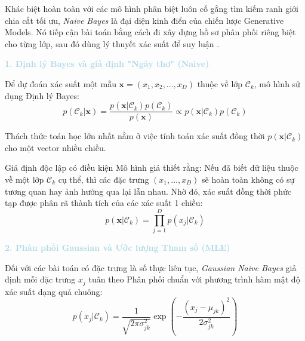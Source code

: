 Khác biệt hoàn toàn với các mô hình phân biệt luôn cố gắng tìm kiếm ranh giới chia cắt tối ưu, \textit{Naive Bayes} là đại diện kinh điển của chiến lược Generative Models. Nó tiếp cận bài toán bằng cách đi xây dựng hồ sơ phân phối riêng biệt cho từng lớp, sau đó dùng lý thuyết xác suất để suy luận \cite{bishop2006pattern}.

\vspace{0.5em}
\noindent\textcolor{lightblue}{\textbf{1. Định lý Bayes và giả định "Ngây thơ" (Naive)}}
\vspace{0.5em}

Để dự đoán xác suất một mẫu $\mathbf{x} = (x_1, x_2, \dots, x_D)$ thuộc về lớp $\mathcal{C}_k$, mô hình sử dụng Định lý Bayes:
\begin{equation}
    p(\mathcal{C}_k | \mathbf{x}) = \frac{p(\mathbf{x} | \mathcal{C}_k) p(\mathcal{C}_k)}{p(\mathbf{x})} \propto p(\mathbf{x} | \mathcal{C}_k) p(\mathcal{C}_k)
\end{equation}

Thách thức toán học lớn nhất nằm ở việc tính toán xác suất đồng thời $p(\mathbf{x} | \mathcal{C}_k)$ cho một vector nhiều chiều. \begin{notebox}{Giả định độc lập có điều kiện}
Mô hình giả thiết rằng: Nếu đã biết dữ liệu thuộc về một lớp $\mathcal{C}_k$ cụ thể, thì các đặc trưng $(x_1, \dots, x_D)$ sẽ hoàn toàn không có sự tương quan hay ảnh hưởng qua lại lẫn nhau. Nhờ đó, xác suất đồng thời phức tạp được phân rã thành tích của các xác suất 1 chiều:
\begin{equation}
    p(\mathbf{x} | \mathcal{C}_k) = \prod_{j=1}^D p(x_j | \mathcal{C}_k)
\end{equation}
\end{notebox}

\vspace{0.5em}
\noindent\textcolor{lightblue}{\textbf{2. Phân phối Gaussian và Ước lượng Tham số (MLE)}}
\vspace{0.5em}

Đối với các bài toán có đặc trưng là số thực liên tục, \textit{Gaussian Naive Bayes} giả định mỗi đặc trưng $x_j$ tuân theo Phân phối chuẩn với phương trình hàm mật độ xác suất dạng quả chuông:
\begin{equation}
    p(x_j | \mathcal{C}_k) = \frac{1}{\sqrt{2\pi\sigma_{jk}^2}} \exp\left(-\frac{(x_j - \mu_{jk})^2}{2\sigma_{jk}^2}\right)
\end{equation}

